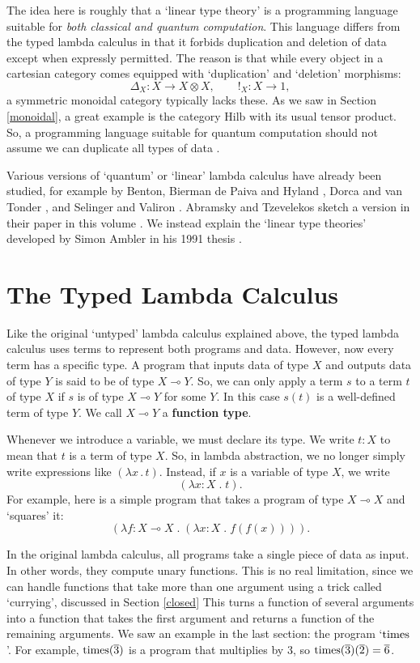 \documentclass[12pt,twoside,openright]{report}
\newcommand{\Hilb}{\mathrm{Hilb}}
\newcommand{\maps}{\colon}
\newcommand{\lhom}{\multimap}
\newcommand{\tensor}{\otimes}
\newcommand{\Times}{{\rm times}}
\begin{document}
The idea here is roughly that a `linear type theory' is a programming language suitable for {\it both classical and quantum computation}.  This language differs from the typed lambda calculus in that it forbids duplication and deletion of data except when expressly permitted.  The reason is that while every object in a cartesian category comes equipped with `duplication' and `deletion' morphisms:
\[   \Delta_X \maps X \to X \tensor X, \qquad !_X \maps X \to 1 , \]
a symmetric monoidal category typically lacks these.  As we saw in Section \ref{monoidal}, a great example is the category $\Hilb$ with its usual tensor product.  So, a programming language suitable for quantum computation should not assume we can duplicate all types of data \cite{ChuangNielsen,WZ}.

Various versions of `quantum' or `linear' lambda calculus have already been studied, for example by Benton, Bierman de Paiva and Hyland
\cite{BBPH}, Dorca and van Tonder \cite{vT}, and Selinger and Valiron
\cite{SV}.  Abramsky and Tzevelekos sketch a version in their paper in this volume \cite{AT}.  We instead explain the `linear type theories'
developed by Simon Ambler in his 1991 thesis \cite{Ambler}.

\section{The Typed Lambda Calculus}
\label{lambda}

Like the original `untyped' lambda calculus explained above, the typed lambda calculus uses terms to represent both programs and data. However, now every term has a specific type.  A program that inputs data of type $X$ and outputs data of type $Y$ is said to be of type $X
\lhom Y$.  So, we can only apply a term $s$ to a term $t$ of type $X$
if $s$ is of type $X \lhom Y$ for some $Y$.  In this case $s(t)$ is a well-defined term of type $Y$.  We call $X \lhom Y$ a {\bf function type}.

Whenever we introduce a variable, we must declare its type.  We write
$t\!:\!X$ to mean that $t$ is a term of type $X$.  So, in lambda abstraction, we no longer simply write expressions like $(\lambda x\, . \,t)$.  Instead, if $x$ is a variable of type $X$, we write
\[      (\lambda x\!:\!X \; .\; t) . \] 
For example, here is a simple program that takes a program of type $X \lhom X$ and `squares' it:
\[       (\lambda f\!:\!X \lhom X \;.\;(\lambda \!x:\!X \; . \; f(f(x)))) .\]

In the original lambda calculus, all programs take a single piece of data as input.  In other words, they compute unary functions.  This is no real limitation, since we can handle functions that take more than one argument using a trick called `currying', discussed in Section
\ref{closed}  This turns a function of several arguments into a function that takes the first argument and returns a function of the remaining arguments.  We saw an example in the last section: the program `$\Times$'.  For example, $\Times(\overline{3})$ is a program that multiplies by 3, so $\Times(\overline{3})(\overline{2}) =
\overline{6}$.
\end{document}
